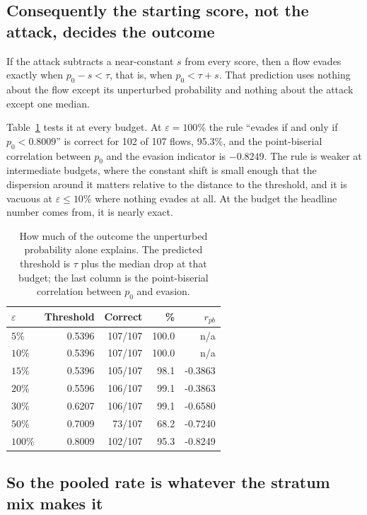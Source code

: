 \documentclass[journal]{IEEEtran}
\theoremstyle{definition}
\newcommand{\CNsweep}{107}
\newcommand{\XThr}{0.8009}
\newcommand{\XRuleOk}{102}
\newcommand{\XRulePct}{95.3}
\newcommand{\XCorr}{-0.8249}
\begin{document}
\subsection{Consequently the starting score, not the attack, decides the outcome}
\label{sec:decides}

If the attack subtracts a near-constant $s$ from every score, then a flow evades
exactly when $p_0 - s < \tau$, that is, when $p_0 < \tau + s$. That prediction
uses nothing about the flow except its unperturbed probability and nothing about
the attack except one median.

Table~\ref{tab:rule} tests it at every budget. At $\varepsilon = 100$\% the rule
``evades if and only if $p_0 < \XThr$'' is correct for \XRuleOk{} of \CNsweep{}
flows, \XRulePct\%, and the point-biserial correlation between $p_0$ and the
evasion indicator is $\XCorr$. The rule is weaker at intermediate budgets, where
the constant shift is small enough that the dispersion around it matters
relative to the distance to the threshold, and it is vacuous at
$\varepsilon \le 10$\% where nothing evades at all. At the budget the headline
number comes from, it is nearly exact.

\begin{table}[t]
\caption{How much of the outcome the unperturbed probability alone explains. The
predicted threshold is $\tau$ plus the median drop at that budget; the last
column is the point-biserial correlation between $p_0$ and evasion.}
\label{tab:rule}
\centering
\footnotesize
\setlength{\tabcolsep}{5pt}
\begin{tabular}{@{}lrrrr@{}}
\toprule
$\varepsilon$ & Threshold & Correct & \% & $r_{pb}$ \\
\midrule
$5\%$ & 0.5396 & 107/107 & 100.0 & n/a \\
$10\%$ & 0.5396 & 107/107 & 100.0 & n/a \\
$15\%$ & 0.5396 & 105/107 & 98.1 & -0.3863 \\
$20\%$ & 0.5596 & 106/107 & 99.1 & -0.3863 \\
$30\%$ & 0.6207 & 106/107 & 99.1 & -0.6580 \\
$50\%$ & 0.7009 & 73/107 & 68.2 & -0.7240 \\
$100\%$ & 0.8009 & 102/107 & 95.3 & -0.8249 \\
\bottomrule
\end{tabular}
\end{table}

\subsection{So the pooled rate is whatever the stratum mix makes it}
\label{sec:mix}
\end{document}
